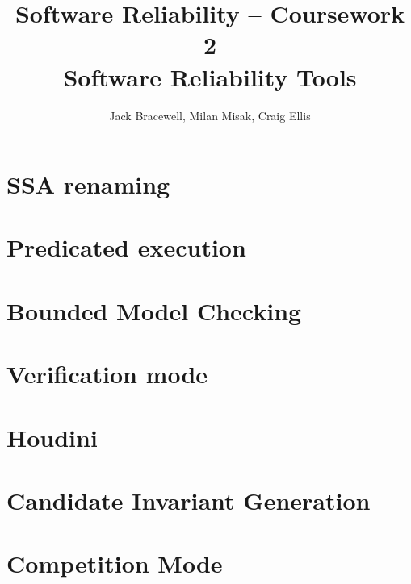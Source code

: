 \documentclass[11pt]{article}
\title{Software Reliability -- Coursework 2 \\ Software Reliability Tools}
\author{Jack Bracewell, Milan Misak, Craig Ellis}
\date{}
\begin{document}
\maketitle

\section{SSA renaming}
\section{Predicated execution}
\section{Bounded Model Checking}
\section{Verification mode}
\section{Houdini}
\section{Candidate Invariant Generation}
\section{Competition Mode}
\end{document}
